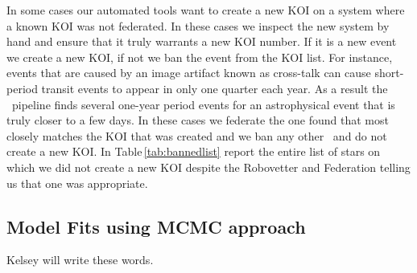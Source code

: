 In some cases our automated tools want to create a new KOI on a system where a known KOI was not federated.  In these cases we inspect the new system by hand and ensure that it truly warrants a new KOI number. If it is a new event we create a new KOI, if not we ban the event from the KOI list.  For instance, events that are caused by an image artifact known as cross-talk \citet{Coughlin2014a} can cause short-period transit events to appear in only one quarter each year. As a result the \Kepler\ pipeline finds several one-year period events for an astrophysical event that is truly closer to a few days.  In these cases we federate the one found that most closely matches the KOI that was created and we ban any other \opstce\ and do not create a new KOI.  In Table\,\ref{tab:bannedlist} report the entire list of stars on which we did not create a new KOI despite the Robovetter and Federation telling us that one was appropriate.


\subsection{Model Fits using MCMC approach}
\label{s:transitfits}
Kelsey will write these words.



